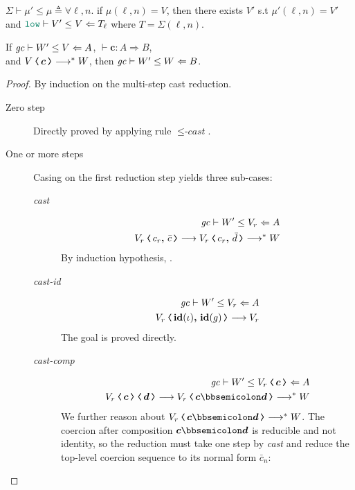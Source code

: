 \begin{definition}
\label{def:sim-heap}
$\Sigma \vdash \mu' \leq \mu \triangleq \forall \ell, n.$ if $\mu(\ell,n) = V$, then there exists
$V'$ s.t $\mu'(\ell,n) = V'$ and $\simrel{\low}{V'}{V}{T_{\ell}}$ where $T = \Sigma(\ell,n)$.
\end{definition}

\begin{lemma}
  \label{lem:cast-sim}
  If ${\mathit{gc}}\vdash{W'}\leq{V}\Leftarrow{A}$, $\vdash \bm{c} : A \Rightarrow B$, \\
  and $\cccast{V}{\bm{c}} \longrightarrow^{*} W$, then ${\mathit{gc}}\vdash{W'}\leq{W}\Leftarrow{B}$.
\end{lemma}
\begin{proof}
By induction on the multi-step cast reduction.
\begin{description}
\item[Zero step] Directly proved by applying rule ${\leq}\textit{-cast}$.
\item[One or more steps] Casing on the first reduction step yields three sub-cases:
\begin{description}
\item[\textit{cast}]
\begin{align}
\simrel{\gc}{W'}{V_r}{A} \\
\cccast{V_r}{\coerc{c_r}{\bar{c}}} \longrightarrow \cccast{V_r}{\coerc{c_r}{\bar{d}}} \longrightarrow^{*} W
\end{align}
By induction hypothesis, .
\item[\textit{cast-id}]
\begin{align}
\simrel{\gc}{W'}{V_r}{A} \\
\cccast{V_r}{\coerc{\id{\iota}}{\id{g}}} \longrightarrow V_r
\end{align}
The goal is proved directly.
\item[\textit{cast-comp}]
\begin{align}
\simrel{\gc}{W'}{\cccast{V_r}{\bm{c}}}{A} \\
\cccast{\cccast{V_r}{\bm{c}}}{\bm{d}} \longrightarrow \cccast{V_r}{\bm{c} \mdoubleplus \bm{d}} \longrightarrow^{*} W
\end{align}
We further reason about $\cccast{V_r}{\bm{c} \mdoubleplus \bm{d}} \longrightarrow^{*} W$. The coercion
after composition $\bm{c} \mdoubleplus \bm{d}$ is reducible and not identity, so the reduction must
take one step by \textit{cast} and reduce the top-level coercion sequence to its normal form $\bar{c}_n$:

\end{description}
\end{description}
\end{proof}
